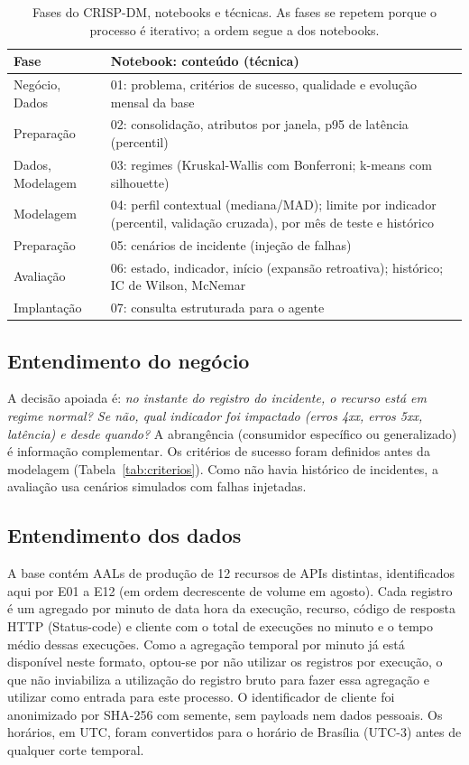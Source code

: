 \documentclass[sigconf,nonacm]{acmart}
\begin{document}
\begin{table}[t]
  \caption{Fases do CRISP-DM, notebooks e técnicas. As fases se repetem porque
  o processo é iterativo; a ordem segue a dos notebooks.}
  \label{tab:fases}
  \small
  \begin{tabular}{p{}p{}}
    \toprule
    Fase & Notebook: conteúdo (técnica) \\
    \midrule
    Negócio, Dados & 01: problema, critérios de sucesso, qualidade e evolução mensal da base \\
    Preparação & 02: consolidação, atributos por janela, p95 de latência (percentil) \\
    Dados, Modelagem & 03: regimes (Kruskal-Wallis com Bonferroni; k-means com silhouette) \\
    Modelagem & 04: perfil contextual (mediana/MAD); limite por indicador (percentil, validação cruzada), por mês de teste e histórico \\
    Preparação & 05: cenários de incidente (injeção de falhas) \\
    Avaliação & 06: estado, indicador, início (expansão retroativa); histórico; IC de Wilson, McNemar \\
    Implantação & 07: consulta estruturada para o agente \\
    \bottomrule
  \end{tabular}
\end{table}

\subsection{Entendimento do negócio}
A decisão apoiada é: \emph{no instante do registro do incidente, o recurso está em regime normal? Se não, qual indicador foi impactado (erros 4xx, erros 5xx, latência) e desde quando?} A abrangência (consumidor específico ou generalizado) é informação complementar. Os critérios de sucesso foram definidos antes da modelagem (Tabela~\ref{tab:criterios}). Como não havia histórico de incidentes, a avaliação usa cenários simulados com falhas injetadas.

\subsection{Entendimento dos dados}
A base contém AALs de produção de 12 recursos de APIs distintas, identificados aqui por E01 a E12 (em ordem decrescente de volume em agosto). Cada registro é um agregado por minuto de data hora da execução, recurso, código de resposta HTTP (Status-code) e cliente com o total de execuções no minuto e o tempo médio dessas execuções. Como a agregação temporal por minuto já está disponível neste formato, optou-se por não utilizar os registros por execução, o que não inviabiliza a utilização do registro bruto para fazer essa agregação e utilizar como entrada para este processo. O identificador de cliente foi anonimizado por SHA-256 com semente, sem payloads nem dados pessoais. Os horários, em UTC, foram convertidos para o horário de Brasília (UTC-3) antes de qualquer corte temporal.
\end{document}
